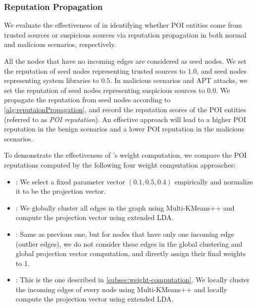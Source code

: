 


\subsubsection{Reputation Propagation}
\label{subsec:reputation-results}
We evaluate the effectiveness of \tool in identifying whether POI entities come from trusted sources or suspicious sources via reputation propagation in both normal and malicious scenarios, respectively.

All the nodes that have no incoming edges are considered as seed nodes.
We set the reputation of seed nodes representing trusted sources to $1.0$,
and seed nodes representing system libraries to $0.5$.
In malicious scenarios and APT attacks, we set the reputation of seed nodes representing suspicious sources to $0.0$.
We propagate the reputation from seed nodes according to \cref{alg:reputaionPropagation},
and record the reputation scores of the POI entities (referred to as \emph{POI reputation}).
An effective approach will lead to a higher POI reputation in the benign scenarios and a lower POI reputation in the malicious scenarios.

To demonstrate the effectiveness of \tool's weight computation, we compare the POI reputations computed by the following four weight computation approaches:
\begin{itemize}[noitemsep, topsep=1pt, partopsep=1pt, listparindent=\parindent, leftmargin=*]
    
    \item \lpfixed: We select a fixed parameter vector $(0.1, 0.5, 0.4)$ empirically and normalize it to be the projection vector.
    
    \item \lpglobal: We globally cluster all edges in the graph using Multi-KMeans++ and compute the projection vector using extended LDA. 
    
    \item \lpglobalplus: Same as previous one, but for nodes that have only one incoming edge (\ie outlier edges), we do not consider these edges in the global clustering and global projection vector computation, and directly assign their final weights to 1.

    \item \tool: This is the one described in \cref{subsec:weight-computation}. We locally cluster the incoming edges of every node using Multi-KMeans++ and locally compute the projection vector using extended LDA.
    
\end{itemize}

